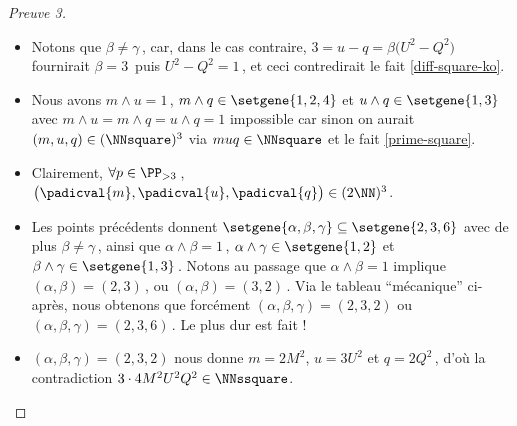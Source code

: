 \begin{proof}[Preuve 3]
\begin{itemize}
		\item Notons que $\beta \neq \gamma$\,, car, dans le cas contraire, $3 = u - q = \beta \big( U^2 - Q^2 \big)$ fournirait $\beta = 3$\, puis $U^2 - Q^2 = 1$\,, et ceci contredirait le fait \ref{diff-square-ko}.


		\item Nous avons $m \wedge u = 1$\,, $m \wedge q \in \setgene{1, 2, 4}$ et $u \wedge q \in \setgene{1, 3}$
		avec $m \wedge u = m \wedge q = u \wedge q = 1$ impossible car sinon on aurait $(m, u, q) \in ( \NNsquare )^3$ via $muq \in \NNsquare$ et le fait \ref{prime-square}.


		\item Clairement, $\forall p \in \PP_{>3}$\,, $\big( \padicval{m} , \padicval{u} , \padicval{q} \big) \in ( 2 \NN )^3$.


		\item Les points précédents donnent 
		$\setgene{\alpha, \beta, \gamma} \subseteq \setgene{2, 3, 6}$
		avec de plus
		$\beta \neq \gamma$\,,
		ainsi que 
		$\alpha \wedge \beta = 1$\,, $\alpha \wedge \gamma \in \setgene{1, 2}$ et $\beta \wedge \gamma \in \setgene{1, 3}$\,.
		Notons au passage que $\alpha \wedge \beta = 1$ implique $(\alpha, \beta) = (2, 3)$\,, ou $(\alpha, \beta) = (3, 2)$\,.
		Via le tableau \enquote{mécanique} ci-après, nous obtenons que forcément $(\alpha, \beta, \gamma) = (2, 3, 2)$ ou $(\alpha, \beta, \gamma) = (2, 3, 6)$\,. Le plus dur est fait !
	\end{itemize}

	\begin{center}
	\end{center}


	\begin{itemize}
		\item $(\alpha, \beta, \gamma) = (2, 3, 2)$ nous donne $m = 2 M^2$, $u = 3 U^2$ et $q = 2 Q^2$\,, d'où la contradiction $3 \cdot4 M^2 U^2 Q^2 \in \NNssquare$.



\end{itemize}
\end{proof}
